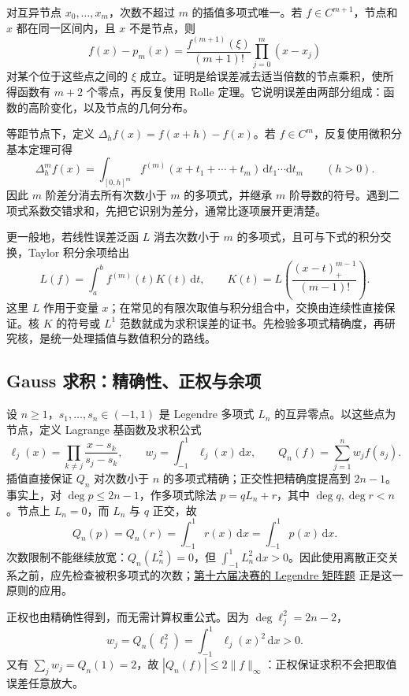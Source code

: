 \documentclass[UTF8,12pt,a4paper,fontset=fandol]{ctexart}
\begin{document}
\label{app:estimate-interpolation}

对互异节点 $x_0,\ldots,x_m$，次数不超过 $m$ 的插值多项式唯一。若 $f\in C^{m+1}$，节点和 $x$ 都在同一区间内，且 $x$ 不是节点，则
\[
f(x)-p_m(x)=\frac{f^{(m+1)}(\xi)}{(m+1)!}\prod_{j=0}^m(x-x_j)
\]
对某个位于这些点之间的 $\xi$ 成立。证明是给误差减去适当倍数的节点乘积，使所得函数有 $m+2$ 个零点，再反复使用 Rolle 定理。它说明误差由两部分组成：函数的高阶变化，以及节点的几何分布。

等距节点下，定义 $\Delta_h f(x)=f(x+h)-f(x)$。若 $f\in C^m$，反复使用微积分基本定理可得
\[
\Delta_h^m f(x)=\int_{[0,h]^m}f^{(m)}(x+t_1+\cdots+t_m)\,\mathrm dt_1\cdots\mathrm dt_m
\qquad(h>0).
\]
因此 $m$ 阶差分消去所有次数小于 $m$ 的多项式，并继承 $m$ 阶导数的符号。遇到二项式系数交错求和，先把它识别为差分，通常比逐项展开更清楚。

更一般地，若线性误差泛函 $L$ 消去次数小于 $m$ 的多项式，且可与下式的积分交换，Taylor 积分余项给出
\[
L(f)=\int_a^b f^{(m)}(t)K(t)\,\mathrm dt,
\qquad K(t)=L\!\left(\frac{(x-t)_+^{m-1}}{(m-1)!}\right).
\]
这里 $L$ 作用于变量 $x$；在常见的有限次取值与积分组合中，交换由连续性直接保证。核 $K$ 的符号或 $L^1$ 范数就成为求积误差的证书。先检验多项式精确度，再研究核，是统一处理插值与数值积分的路线。

\subsection{Gauss 求积：精确性、正权与余项}

\label{app:estimate-gauss}

设 $n\ge1$，$s_1,\ldots,s_n\in(-1,1)$ 是 Legendre 多项式 $L_n$ 的互异零点。以这些点为节点，定义 Lagrange 基函数及求积公式
\[
\ell_j(x)=\prod_{k\ne j}\frac{x-s_k}{s_j-s_k},\qquad
w_j=\int_{-1}^1\ell_j(x)\,\mathrm dx,\qquad
Q_n(f)=\sum_{j=1}^nw_jf(s_j).
\]
插值直接保证 $Q_n$ 对次数小于 $n$ 的多项式精确；正交性把精确度提高到 $2n-1$。事实上，对 $\deg p\le2n-1$，作多项式除法 $p=qL_n+r$，其中 $\deg q,\deg r<n$。节点上 $L_n=0$，而 $L_n$ 与 $q$ 正交，故
\[
Q_n(p)=Q_n(r)=\int_{-1}^1r(x)\,\mathrm dx
=\int_{-1}^1p(x)\,\mathrm dx.
\]
次数限制不能继续放宽：$Q_n(L_n^2)=0$，但 $\int_{-1}^1L_n^2\,\mathrm dx>0$。因此使用离散正交关系之前，应先检查被积多项式的次数；\hyperref[pr:fin16-high:13]{第十六届决赛的 Legendre 矩阵题} 正是这一原则的应用。

正权也由精确性得到，而无需计算权重公式。因为 $\deg\ell_j^2=2n-2$，
\[
w_j=Q_n(\ell_j^2)=\int_{-1}^1\ell_j(x)^2\,\mathrm dx>0.
\]
又有 $\sum_jw_j=Q_n(1)=2$，故 $|Q_n(f)|\le2\|f\|_\infty$：正权保证求积不会把取值误差任意放大。
\end{document}
